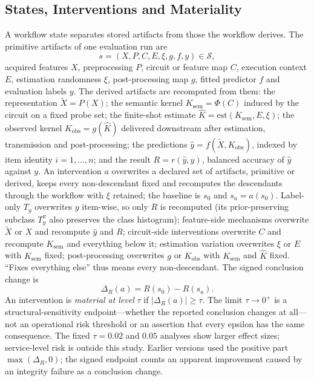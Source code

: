 \documentclass[10pt,journal,compsoc]{IEEEtran}
\begin{document}
\subsection{States, Interventions and Materiality}

A workflow state separates stored artifacts from those the workflow derives.
The primitive artifacts of one evaluation run are
\begin{equation}
  s=(X,P,C,E,\xi,g,f,y)\in\mathcal S,
  \label{eq:workflow}
\end{equation}
acquired features $X$, preprocessing $P$, circuit or feature map $C$,
execution context $E$, estimation randomness $\xi$, post-processing map $g$,
fitted predictor $f$ and evaluation labels $y$. The derived artifacts are
recomputed from them: the representation $\tilde X=P(X)$; the semantic kernel
$K_{\mathrm{sem}}=\Phi(C)$ induced by the circuit on a fixed probe set; the
finite-shot estimate $\hat K=\mathrm{est}(K_{\mathrm{sem}},E,\xi)$; the
observed kernel $K_{\mathrm{obs}}=g(\hat K)$ delivered downstream after
estimation, transmission and post-processing; the predictions
$\hat y=f(\tilde X,K_{\mathrm{obs}})$, indexed by item identity
$i=1,\dots,n$; and the result $R=r(\hat y,y)$, balanced accuracy of $\hat y$
against $y$. An intervention $a$ overwrites a declared set of artifacts,
primitive or derived, keeps every non-descendant fixed and recomputes the
descendants through the workflow with $\xi$ retained; the baseline is $s_0$
and $s_a=a(s_0)$. Label-only $T_y$ overwrites $y$ item-wise, so only $R$ is
recomputed (its prior-preserving subclass $T_y^{\pi}$ also preserves the
class histogram); feature-side mechanisms overwrite $\tilde X$ or $X$ and
recompute $\hat y$ and $R$; circuit-side interventions overwrite $C$ and
recompute $K_{\mathrm{sem}}$ and everything below it; estimation variation
overwrites $\xi$ or $E$ with $K_{\mathrm{sem}}$ fixed; post-processing
overwrites $g$ or $K_{\mathrm{obs}}$ with $K_{\mathrm{sem}}$ and $\hat K$
fixed. ``Fixes everything else'' thus means every non-descendant. The signed
conclusion change is
\begin{equation}
  \Delta_R(a)=R(s_0)-R(s_a).
  \label{eq:conclusion-impact}
\end{equation}
An intervention is \emph{material at level} $\tau$ if $|\Delta_R(a)|\ge\tau$.
The limit $\tau\to0^{+}$ is a structural-sensitivity endpoint---whether the
reported conclusion changes at all---not an operational risk threshold or an
assertion that every epsilon has the same consequence. The fixed
$\tau=0.02$ and $0.05$ analyses
show larger effect sizes; service-level risk is outside this study. Earlier
versions used the positive part $\max(\Delta_R,0)$; the signed endpoint counts
an apparent improvement caused by an integrity failure as a conclusion change.
\end{document}
